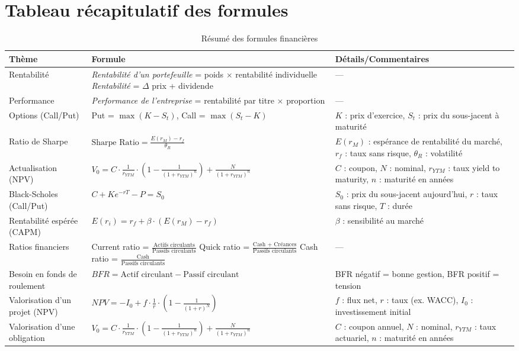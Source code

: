 \documentclass[a4paper, 12pt]{article}
\begin{document}
	
	\section*{Tableau récapitulatif des formules}
	
	\begin{table}[ht]
		\centering
		\begin{tabular}{|p{4cm}|p{8cm}|p{4cm}|}
			\hline
			\textbf{Thème} & \textbf{Formule} & \textbf{Détails/Commentaires} \\
			\hline
			Rentabilité & 
			\textit{Rentabilité d’un portefeuille} = poids $\times$ rentabilité individuelle \newline
			\textit{Rentabilité} = $\Delta$ prix + dividende &
			--- \\
			\hline
			Performance & 
			\textit{Performance de l’entreprise} = rentabilité par titre $\times$ proportion & --- \\
			\hline
			Options (Call/Put) & 
			Put = $\max(K - S_t)$, Call = $\max(S_t - K)$ &
			$K$ : prix d'exercice, $S_t$ : prix du sous-jacent à maturité \\
			\hline
			Ratio de Sharpe & 
			$\text{Sharpe Ratio} = \frac{E(r_M) - r_f}{\theta_R}$ &
			$E(r_M)$ : espérance de rentabilité du marché, $r_f$ : taux sans risque, $\theta_R$ : volatilité \\
			\hline
			Actualisation (NPV) & 
			$V_0 = C \cdot \frac{1}{r_{YTM}} \cdot \left(1 - \frac{1}{(1 + r_{YTM})^n}\right) + \frac{N}{(1 + r_{YTM})^n}$ &
			$C$ : coupon, $N$ : nominal, $r_{YTM}$ : taux yield to maturity, $n$ : maturité en années \\
			\hline
			Black-Scholes (Call/Put) & 
			$C + K e^{-rT} - P = S_0$ &
			$S_0$ : prix du sous-jacent aujourd'hui, $r$ : taux sans risque, $T$ : durée \\
			\hline
			Rentabilité espérée (CAPM) & 
			$E(r_i) = r_f + \beta \cdot (E(r_M) - r_f)$ &
			$\beta$ : sensibilité au marché \\
			\hline
			Ratios financiers & 
			Current ratio = $\frac{\text{Actifs circulants}}{\text{Passifs circulants}}$ \newline
			Quick ratio = $\frac{\text{Cash + Créances}}{\text{Passifs circulants}}$ \newline
			Cash ratio = $\frac{\text{Cash}}{\text{Passifs circulants}}$ &
			--- \\
			\hline
			Besoin en fonds de roulement & 
			$BFR = \text{Actif circulant} - \text{Passif circulant}$ &
			BFR négatif = bonne gestion, BFR positif = tension \\
			\hline
			Valorisation d’un projet (NPV) & 
			$NPV = -I_0 + f \cdot \frac{1}{r} \cdot \left(1 - \frac{1}{(1 + r)^N}\right)$ &
			$f$ : flux net, $r$ : taux (ex. WACC), $I_0$ : investissement initial \\
			\hline
			Valorisation d'une obligation & 
			$V_0 = C \cdot \frac{1}{r_{YTM}} \cdot \left(1 - \frac{1}{(1 + r_{YTM})^n}\right) + \frac{N}{(1 + r_{YTM})^n}$ &
			$C$ : coupon annuel, $N$ : nominal, $r_{YTM}$ : taux actuariel, $n$ : maturité en années \\
			\hline
		\end{tabular}
		\caption{Résumé des formules financières}
	\end{table}
	
\end{document}
